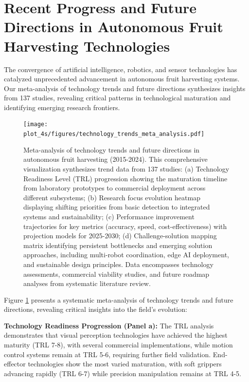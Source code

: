 \documentclass[a4paper,fleqn]{cas-dc}
\begin{document}
\section{Recent Progress and Future Directions in Autonomous Fruit Harvesting Technologies}

The convergence of artificial intelligence, robotics, and sensor technologies has catalyzed unprecedented advancement in autonomous fruit harvesting systems. Our meta-analysis of technology trends and future directions synthesizes insights from 137 studies, revealing critical patterns in technological maturation and identifying emerging research frontiers.

\begin{figure}[htbp]
\centering
\texttt{[image: plot\_4s/figures/technology\_trends\_meta\_analysis.pdf]}
\caption{Meta-analysis of technology trends and future directions in autonomous fruit harvesting (2015-2024). This comprehensive visualization synthesizes trend data from 137 studies: (a) Technology Readiness Level (TRL) progression showing the maturation timeline from laboratory prototypes to commercial deployment across different subsystems; (b) Research focus evolution heatmap displaying shifting priorities from basic detection to integrated systems and sustainability; (c) Performance improvement trajectories for key metrics (accuracy, speed, cost-effectiveness) with projection models for 2025-2030; (d) Challenge-solution mapping matrix identifying persistent bottlenecks and emerging solution approaches, including multi-robot coordination, edge AI deployment, and sustainable design principles. Data encompasses technology assessments, commercial viability studies, and future roadmap analyses from systematic literature review.}
\label{fig:technology_trends_meta}
\end{figure}

Figure \ref{fig:technology_trends_meta} presents a systematic meta-analysis of technology trends and future directions, revealing critical insights into the field's evolution:

\textbf{Technology Readiness Progression (Panel a):} The TRL analysis demonstrates that visual perception technologies have achieved the highest maturity (TRL 7-8), with several commercial implementations, while motion control systems remain at TRL 5-6, requiring further field validation. End-effector technologies show the most varied maturation, with soft grippers advancing rapidly (TRL 6-7) while precision manipulation remains at TRL 4-5.
\end{document}
